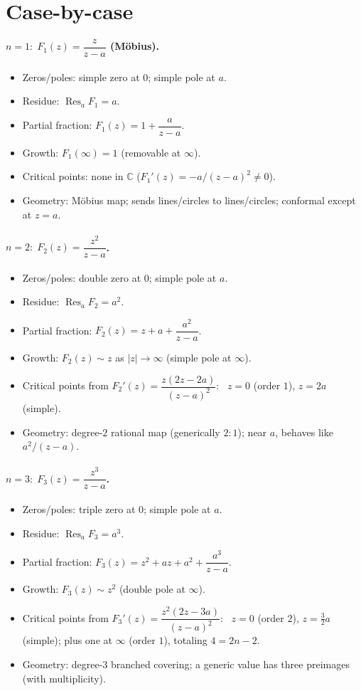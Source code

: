 \documentclass[11pt]{article}
\DeclareMathOperator{\Res}{Res}
\begin{document}
\section*{Case-by-case}

\paragraph{$n=1:\; F_1(z)=\dfrac{z}{z-a}$ \;(Möbius).}
\begin{itemize}
	\item Zeros/poles: simple zero at $0$; simple pole at $a$.
	\item Residue: $\Res_{a}F_1=a$.
	\item Partial fraction: $F_1(z)=1+\dfrac{a}{z-a}$.
	\item Growth: $F_1(\infty)=1$ (removable at $\infty$).
	\item Critical points: none in $\mathbb C$ ($F_1'(z)=-a/(z-a)^2\neq0$).
	\item Geometry: Möbius map; sends lines/circles to lines/circles; conformal except at $z=a$.
\end{itemize}

\paragraph{$n=2:\; F_2(z)=\dfrac{z^{2}}{z-a}$.}
\begin{itemize}
	\item Zeros/poles: double zero at $0$; simple pole at $a$.
	\item Residue: $\Res_{a}F_2=a^{2}$.
	\item Partial fraction: $F_2(z)=z+a+\dfrac{a^{2}}{z-a}$.
	\item Growth: $F_2(z)\sim z$ as $|z|\to\infty$ (simple pole at $\infty$).
	\item Critical points from $F_2'(z)=\dfrac{z(2z-2a)}{(z-a)^2}$:
	\ $z=0$ (order $1$), $z=2a$ (simple).
	\item Geometry: degree-$2$ rational map (generically $2{:}1$); near $a$, behaves like $a^{2}/(z-a)$.
\end{itemize}

\paragraph{$n=3:\; F_3(z)=\dfrac{z^{3}}{z-a}$.}
\begin{itemize}
	\item Zeros/poles: triple zero at $0$; simple pole at $a$.
	\item Residue: $\Res_{a}F_3=a^{3}$.
	\item Partial fraction: $F_3(z)=z^{2}+az+a^{2}+\dfrac{a^{3}}{z-a}$.
	\item Growth: $F_3(z)\sim z^{2}$ (double pole at $\infty$).
	\item Critical points from $F_3'(z)=\dfrac{z^{2}(2z-3a)}{(z-a)^2}$:
	\ $z=0$ (order $2$), $z=\tfrac{3}{2}a$ (simple); plus one at $\infty$ (order $1$), totaling $4=2n-2$.
	\item Geometry: degree-$3$ branched covering; a generic value has three preimages (with multiplicity).
\end{itemize}
\end{document}
